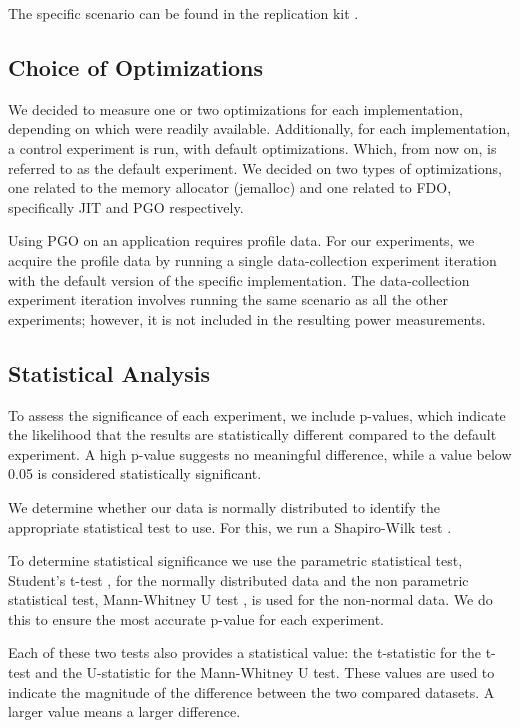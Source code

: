 \documentclass[main.tex]{subfiles}
\begin{document}
The specific scenario can be found in the replication kit \cite{replication-kit-Karlsen_Landsgaard_Offenberg_Pedersen_2025}.

\subsection{Choice of Optimizations}
We decided to measure one or two optimizations for each implementation, depending on which were readily available. Additionally, for each implementation, a control experiment is run, with default optimizations. Which, from now on, is referred to as the default experiment. We decided on two types of optimizations, one related to the memory allocator (jemalloc) and one related to FDO, specifically JIT and PGO respectively.

Using PGO on an application requires profile data. For our experiments, we acquire the profile data by running a single data-collection experiment iteration with the default version of the specific implementation. The data-collection experiment iteration involves running the same scenario as all the other experiments; however, it is not included in the resulting power measurements. 

\subsection{Statistical Analysis}
To assess the significance of each experiment, we include p-values, which indicate the likelihood that the results are statistically different compared to the default experiment. A high p-value suggests no meaningful difference, while a value below 0.05 is considered statistically significant. 

We determine whether our data is normally distributed to identify the appropriate statistical test to use. For this, we run a Shapiro-Wilk test \cite{shapiro1965analysis}.

To determine statistical significance we use the parametric statistical test, Student's t-test \cite{student1908}, for the normally distributed data and the non parametric statistical test, Mann-Whitney U test \cite{mann1947test}, is used for the non-normal data. We do this to ensure the most accurate p-value for each experiment.

Each of these two tests also provides a statistical value: the t-statistic for the t-test and the U-statistic for the Mann-Whitney U test. These values are used to indicate the magnitude of the difference between the two compared datasets. A larger value means a larger difference. 
\end{document}
